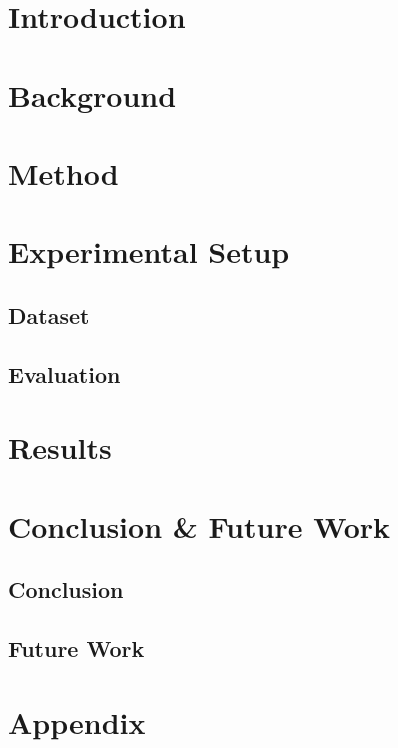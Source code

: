 \documentclass{report}
\begin{document}
\chapter{Introduction}


\chapter{Background}

\chapter{Method}

\chapter{Experimental Setup}

\section{Dataset}
\section{Evaluation}

\chapter{Results}

\chapter{Conclusion \& Future Work}
\section{Conclusion}
\section{Future Work}




\chapter*{Appendix}
\end{document}
